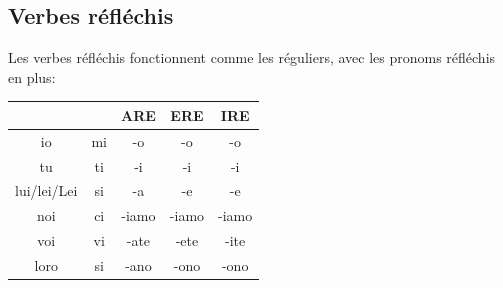 \documentclass[12pt, openany]{report}
\begin{document}
\subsection{Verbes réfléchis}
Les verbes réfléchis fonctionnent comme les réguliers, avec les pronoms réfléchis en plus:
\begin{center}
    \begin{tabular}{c||c|c|c|c}
        & & ARE & ERE & IRE\\
        \hline
        io & mi & -o & -o & -o\\
        tu & ti & -i & -i & -i\\
        lui/lei/Lei & si & -a & -e & -e\\
        noi & ci & -iamo & -iamo & -iamo\\
        voi & vi & -ate & -ete & -ite\\
        loro & si &-ano & -ono & -ono\\
    \end{tabular}
\end{center}
\end{document}
